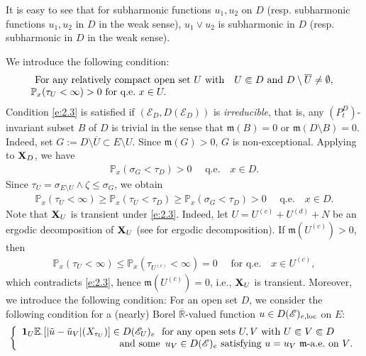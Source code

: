 \documentclass[12pt,a4paper]{article}
\newcommand{\R}{\mathbb{R}}
\newcommand{\m}{\mathfrak{m} }
\newcommand{\loc}{{\rm loc}}
\newcommand{\1}{{\bf 1}}
\begin{document}
It is easy to see that for subharmonic functions $u_1,u_2$ on $D$ (resp. subharmonic functions $u_1,u_2$ in $D$ in the weak sense), 
$u_1\lor u_2$ is subharmonic in $D$ (resp. subharmonic in $D$ in the weak sense).

\bigskip

We introduce the following condition:
\begin{align}
\left.\begin{array}{cc}\text{For any relatively compact open set $U$ with}& U\Subset D\text{ and } D\setminus \overline{U}\ne\emptyset, \\
\hspace{-2.2cm}
\mathbb{P}_x(\tau_U<\infty)>0\text{ for q.e.~}x\in U. & \end{array}\right.\label{e:2.3}
\end{align}
 Condition
\eqref{e:2.3} is satisfied if 
$(\mathscr{E}_D,D(\mathscr{E}_D))$ is
\emph{irreducible}, that is, any $(P_t^D)$-invariant subset $B$ of $D$ is
trivial in the sense that ${\m}(B)=0$ or ${\m}(D\setminus B)=0$. 
Indeed, set $G:=D\setminus\overline{U}\subset E\setminus U$. Since ${\m}(G)>0$, $G$ is non-exceptional. 
Applying \cite[Theorem~3.5.6(i)]{CFbook} to ${\bf X}_D$, we have 
\begin{align*}
\mathbb{P}_x(\sigma_G<\tau_D)>0\quad\text{ q.e.} \quad x\in D. 
\end{align*}
Since $\tau_U=\sigma_{E\setminus U}\land\zeta\leq\sigma_G$, 
we obtain
\begin{align*}
\mathbb{P}_x(\tau_U<\infty)\geq
\mathbb{P}_x(\tau_U<\tau_D)
\geq \mathbb{P}_x(\sigma_G<\tau_D)>0 \quad\text{ q.e.} \quad x\in D.
\end{align*}
Note that ${\bf X}_U$ is transient under \eqref{e:2.3}. 
Indeed, let $U=U^{(c)}+U^{(d)}+N$ be an ergodic decomposition of 
${\bf X}_U$ (see \cite{Kw:ergodic} for ergodic decomposition). If ${\m}(U^{(c)})>0$, then 
\begin{align*}
\mathbb{P}_x(\tau_U<\infty)\leq\mathbb{P}_x(\tau_{U^{(c)}}<\infty)=0\quad\text{ for \ \ q.e.}\quad x\in U^{(c)},
\end{align*}
which contradicts \eqref{e:2.3}, hence ${\m}(U^{(c)})=0$, i.e., ${\bf X}_U$ is transient. Moreover, we introduce the following condition: 
For an open set $D$, we consider the following condition for a (nearly) Borel $\overline{\R}$-valued function $u\in D(\mathscr{E})_{e,\loc}$ 
on $E$: 
\begin{align}
\left\{\begin{array}{rl}\1_U\mathbb{E}_{\cdot}[|\tilde{u}-\tilde{u}_V|(X_{\tau_U})]\in D(\mathscr{E}_U)_e&\text{\!\!for any open sets $U, V$ with $U\Subset V\Subset D$} \\\text{and some\!\!\!}&\text{$u_V\in D(\mathscr{E})_e$ satisfying 
$u=u_V$ ${\m}$-a.e.~on $V$.}\end{array}\right.
\label{eq:2.3}
\end{align}
\end{document}
